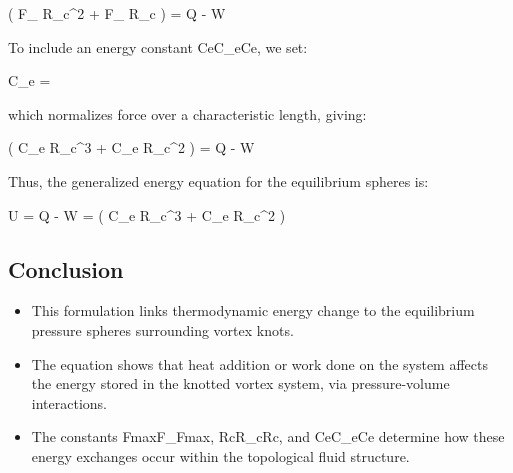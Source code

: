 \Delta \left(  \pi F_{\max} R_c^2 +  F_{\max} R_c \right) = Q - W

To include an energy constant CeC_eCe​, we set:

C_e = 

which normalizes force over a characteristic length, giving:

\Delta \left(  \pi C_e R_c^3 +  C_e R_c^2 \right) = Q - W

Thus, the generalized energy equation for the equilibrium spheres is:

\Delta U = Q - W = \Delta \left(  \pi C_e R_c^3 +  C_e R_c^2 \right)



\subsection*{Conclusion}
\begin{itemize}
\item This formulation links thermodynamic energy change to the equilibrium pressure spheres surrounding vortex knots.


\item The equation shows that heat addition or work done on the system affects the energy stored in the knotted vortex system, via pressure-volume interactions.


\item The constants Fmax⁡F_{\max}Fmax​, RcR_cRc​, and CeC_eCe​ determine how these energy exchanges occur within the topological fluid structure.


\end{itemize}